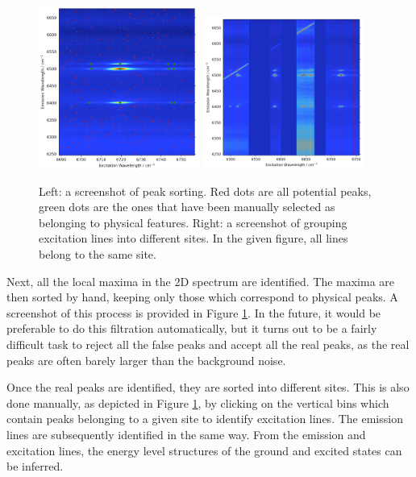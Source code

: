 \documentclass[12pt]{puthesis}
\begin{document}
\begin{figure}[b]
  \centering
  \includegraphics[width=0.47\textwidth]{PeakFinding}
  \hfill
  \includegraphics[width=0.47\textwidth]{LineSorting}
  \caption{Left: a screenshot of peak sorting. Red dots are all potential peaks, green dots are the ones that have been manually selected as belonging to physical features. Right: a screenshot of grouping excitation lines into different sites. In the given figure, all lines belong to the same site.}
  \label{fig:manual}
\end{figure}

Next, all the local maxima in the 2D spectrum are identified. The maxima are then sorted by hand, keeping only those which correspond to physical peaks. A screenshot of this process is provided in Figure \ref{fig:manual}. In the future, it would be preferable to do this filtration automatically, but it turns out to be a fairly difficult task to reject all the false peaks and accept all the real peaks, as the real peaks are often barely larger than the background noise.

Once the real peaks are identified, they are sorted into different sites. This is also done manually, as depicted in Figure \ref{fig:manual}, by clicking on the vertical bins which contain peaks belonging to a given site to identify excitation lines. The emission lines are subsequently identified in the same way. From the emission and excitation lines, the energy level structures of the ground and excited states can be inferred.
\end{document}

